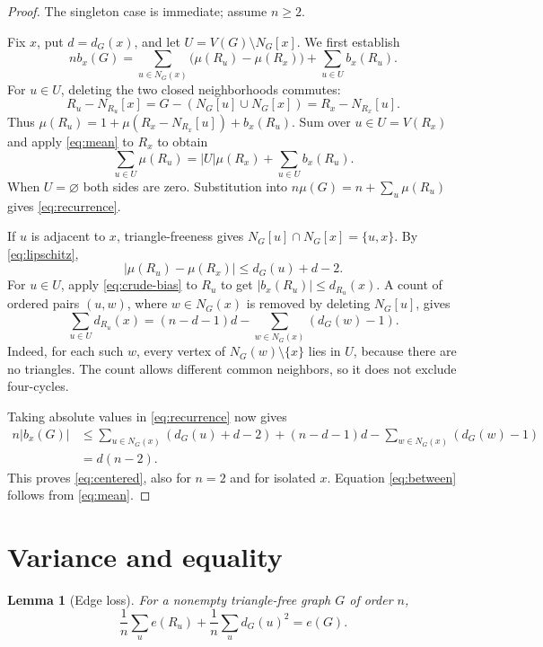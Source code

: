 \documentclass[11pt]{article}
\newtheorem{lemma}[theorem]{Lemma}
\begin{document}
\begin{proof}
The singleton case is immediate; assume $n\ge2$.

Fix $x$, put $d=d_G(x)$, and let $U=V(G)\setminus N_G[x]$. We first establish
\begin{equation}\label{eq:recurrence}
 n b_x(G)=\sum_{u\in N_G(x)}\bigl(\mu(R_u)-\mu(R_x)\bigr)
                  +\sum_{u\in U}b_x(R_u).
\end{equation}
For $u\in U$, deleting the two closed neighborhoods commutes:
\[
 R_u-N_{R_u}[x]=G-(N_G[u]\cup N_G[x])=R_x-N_{R_x}[u].
\]
Thus $\mu(R_u)=1+\mu(R_x-N_{R_x}[u])+b_x(R_u)$. Sum over $u\in U=V(R_x)$ and apply \eqref{eq:mean} to $R_x$ to obtain
\[
 \sum_{u\in U}\mu(R_u)=|U|\mu(R_x)+\sum_{u\in U}b_x(R_u).
\]
When $U=\varnothing$ both sides are zero. Substitution into $n\mu(G)=n+\sum_u\mu(R_u)$ gives \eqref{eq:recurrence}.

If $u$ is adjacent to $x$, triangle-freeness gives $N_G[u]\cap N_G[x]=\{u,x\}$. By \eqref{eq:lipschitz},
\[
 |\mu(R_u)-\mu(R_x)|\le d_G(u)+d-2.
\]
For $u\in U$, apply \eqref{eq:crude-bias} to $R_u$ to get $|b_x(R_u)|\le d_{R_u}(x)$. A count of ordered pairs $(u,w)$, where $w\in N_G(x)$ is removed by deleting $N_G[u]$, gives
\begin{equation}\label{eq:degreecount}
 \sum_{u\in U}d_{R_u}(x)
 =(n-d-1)d-\sum_{w\in N_G(x)}(d_G(w)-1).
\end{equation}
Indeed, for each such $w$, every vertex of $N_G(w)\setminus\{x\}$ lies in $U$, because there are no triangles. The count allows different common neighbors, so it does not exclude four-cycles.

Taking absolute values in \eqref{eq:recurrence} now gives
\begin{align*}
 n|b_x(G)|
 &\le \sum_{u\in N_G(x)}(d_G(u)+d-2)
 +(n-d-1)d-\sum_{w\in N_G(x)}(d_G(w)-1)\\
 &=d(n-2).
\end{align*}
This proves \eqref{eq:centered}, also for $n=2$ and for isolated $x$. Equation \eqref{eq:between} follows from \eqref{eq:mean}.
\end{proof}

\section{Variance and equality}

\begin{lemma}[Edge loss]\label{lem:edges}
For a nonempty triangle-free graph $G$ of order $n$,
\begin{equation}\label{eq:edges}
 \frac1n\sum_u e(R_u)+\frac1n\sum_u d_G(u)^2=e(G).
\end{equation}
\end{lemma}
\end{document}
